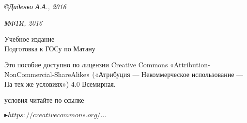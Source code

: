 \medskip
\small
\copyright \textsl{Диденко А.А., 2016}

\medspace

\textsl{МФТИ, 2016}

\vspace*{7\baselineskip}

\center

{\Large Учебное издание}
\\[2\baselineskip]
{\Huge Подготовка к ГОСу по Матану}

\vspace*{\fill}

\noindent
\begin{minipage}[t]{0.61\textwidth}
\quad\small Это пособие доступно по лицензии Creative Commons «Attribution-NonCommercial-ShareAlike» («Атрибуция — Некоммерческое использование — На тех же условиях») 4.0 Всемирная.

 условия читайте по ссылке

\qquad\href{https://creativecommons.org/licenses/by-nc-sa/4.0/deed.ru}{\textcolor{prpl}{$\blacktriangleright https://creativecommons.org/...$}}
\end{minipage}%
\hfill%
\begin{minipage}[t]{\dimexpr(0.39\textwidth-2mm)}
\end{minipage}
